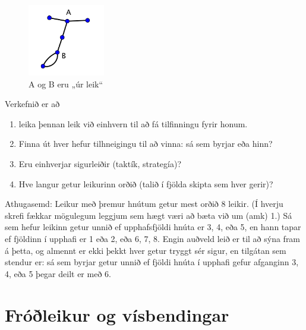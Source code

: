 \documentclass[b5paper,12pt]{book}
\begin{document}
\begin{figure}[h]
  \includegraphics[width=0.3\textwidth, center]{Sprouts2.png}
  \caption*{A og B eru „úr leik“}
\end{figure}

Verkefnið er að 
\begin{enumerate}
\item leika þennan leik við einhvern til að fá tilfinningu fyrir honum.
\item Finna út hver hefur tilhneigingu til að vinna: sá sem byrjar eða hinn?
\item  Eru einhverjar sigurleiðir (taktík, strategía)?
\item Hve langur getur leikurinn orðið (talið í fjölda skipta sem hver gerir)?
\end{enumerate}

Athugasemd:
Leikur með þremur hnútum getur mest orðið 8 leikir. (Í hverju skrefi fækkar mögulegum leggjum sem hægt væri að bæta við um (amk) 1.) Sá sem hefur leikinn getur unnið ef upphafsfjöldi hnúta er 3, 4, eða 5, en hann tapar ef fjöldinn í upphafi er 1 eða 2, eða 6, 7, 8. Engin auðveld leið er til að sýna fram á þetta, og almennt er ekki þekkt hver getur tryggt sér sigur, en tilgátan sem stendur er: sá sem byrjar getur unnið ef fjöldi hnúta í upphafi gefur afganginn 3, 4, eða 5 þegar deilt er með 6. 





\chapter*{Fróðleikur og vísbendingar}
\label{chap:frodleikur}
\end{document}
